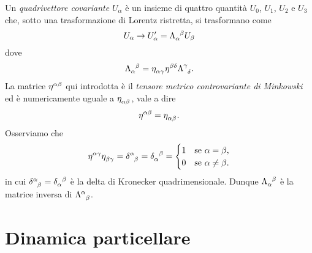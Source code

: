 Un \emph{quadrivettore covariante} $U_{\alpha}$
è un insieme di quattro quantità $U_{0}$, $U_{1}$, $U_{2}$ e $U_{3}$ che, sotto
una trasformazione di Lorentz ristretta, si trasformano come
\begin{equation}
  U_{\alpha} \to U'_{\alpha} = \tensor{\Lambda}{_{\alpha}^{\beta}}U_{\beta}
\end{equation}
dove
\begin{equation}
  \tensor{\Lambda}{_{\alpha}^{\beta}} = \tensor{\eta}{_{\alpha\gamma}}
  \tensor{\eta}{^{\beta\delta}} \tensor{\Lambda}{^{\gamma}_{\delta}}.
\end{equation}
La matrice $\tensor{\eta}{^{\alpha\beta}}$ qui introdotta è il
\emph{tensore
  metrico controvariante di Minkowski}
ed è numericamente uguale a $\tensor{\eta}{_{\alpha\beta}}$, vale a dire
\begin{equation}
  \tensor{\eta}{^{\alpha\beta}} = \tensor{\eta}{_{\alpha\beta}}.
\end{equation}
Osserviamo che
\begin{equation}
  \tensor{\eta}{^{\alpha\gamma}} \tensor{\eta}{_{\beta\gamma}} =
  \tensor{\delta}{^{\alpha}_{\beta}} = \tensor{\delta}{_{\alpha}^{\beta}} =
  \begin{cases}
    1 & \text{se } \alpha = \beta, \\
    0 & \text{se } \alpha \neq \beta.
  \end{cases}
\end{equation}
in cui $\tensor{\delta}{^{\alpha}_{\beta}} = \tensor{\delta}{_{\alpha}^{\beta}}$
è la
delta di Kronecker quadrimensionale.
Dunque $\tensor{\Lambda}{_{\alpha}^{\beta}}$ è la matrice inversa di
$\tensor{\Lambda}{^{\alpha}_{\beta}}$.

\section{Dinamica particellare}
\label{sec:dinamica-particellare}

